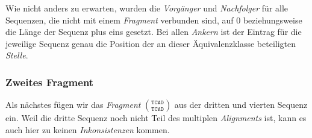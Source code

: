 Wie nicht anders zu erwarten, wurden die \emph{Vorgänger} und \emph{Nachfolger} für alle Sequenzen, die nicht mit einem \emph{Fragment} verbunden sind, auf 0 beziehungsweise die Länge der Sequenz plus eins gesetzt. Bei allen \emph{Ankern} ist der Eintrag für die jeweilige Sequenz genau die Position der an dieser Äquivalenzklasse beteiligten \emph{Stelle}.

\subsubsection{Zweites Fragment}

Als nächstes fügen wir das \emph{Fragment} ${\texttt{TCAD}}\choose{\texttt{TCAD}}$ aus der dritten und vierten Sequenz ein. Weil die dritte Sequenz noch nicht Teil des multiplen \emph{Alignments} ist, kann es auch hier zu keinen \emph{Inkonsistenzen} kommen.


